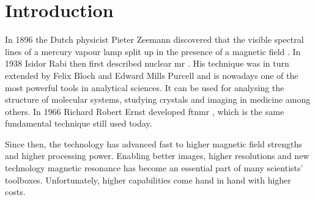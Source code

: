 \chapter{Introduction}


In 1896 the Dutch physicist Pieter Zeemann discovered that the visible spectral lines of a mercury vapour lamp split up in the presence of a magnetic field . In 1938 Isidor Rabi then first described nuclear \acrfull{mr} . His technique was in turn extended by Felix Bloch  and Edward Mills Purcell  and is nowadays one of the most powerful tools in analytical sciences. It can be used for analysing the structure of molecular systems, studying crystals and imaging in medicine among others. In 1966 Richard Robert Ernst developed \acrfull{ftnmr} , which is the same fundamental technique still used today.

Since then, the technology has advanced fast to higher magnetic field strengths and higher processing power. Enabling better images, higher resolutions and new technology magnetic resonance has become an essential part of many scientists' toolboxes. Unfortunately, higher capabilities come hand in hand with higher costs.

